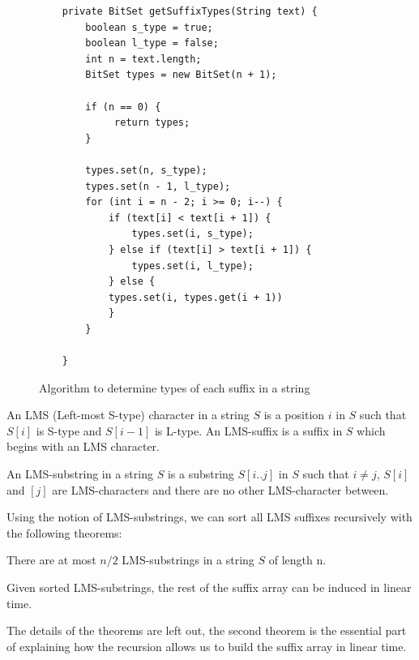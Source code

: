 \begin{figure}
	\begin{center}
		\begin{lstlisting}
    private BitSet getSuffixTypes(String text) {
        boolean s_type = true;
        boolean l_type = false;
        int n = text.length;
        BitSet types = new BitSet(n + 1);
        
        if (n == 0) {
             return types;
        }

        types.set(n, s_type);
        types.set(n - 1, l_type);
        for (int i = n - 2; i >= 0; i--) {
            if (text[i] < text[i + 1]) {
                types.set(i, s_type);
            } else if (text[i] > text[i + 1]) {
                types.set(i, l_type);
            } else {
            types.set(i, types.get(i + 1))
            }
        }

    }
\end{lstlisting}
	\end{center}
	\caption{Algorithm to determine types of each suffix in a string}
	\label{fig:sais-types}
\end{figure}


\begin{definition}
    An LMS (Left-most S-type) character in a string $S$ is a position $i$ in $S$ such that
    $S[i]$ is S-type and $S[i-1]$ is L-type. An LMS-suffix is a suffix in $S$ which begins
    with an LMS character.
\end{definition}

\begin{definition}
    An LMS-substring in a string $S$ is a substring $S[i..j]$ in $S$ such that
    $i \neq j$, $S[i]$ and $[j]$ are LMS-characters and there are no other LMS-character between.
\end{definition}

Using the notion of LMS-substrings, we can sort all LMS suffixes recursively with the
following theorems:

\begin{theorem}
    There are at most $n / 2$ LMS-substrings in a string $S$ of length n.
\end{theorem}

\begin{theorem}
    Given sorted LMS-substrings, the rest of the suffix array can be induced in linear
    time.
\end{theorem}

The details of the theorems are left out, the second theorem is the essential part of
explaining how the recursion allows us to build the suffix array in linear time.

